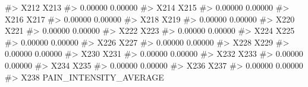 \documentclass[
  letterpaper,
]{latex/krantz}
\makeatletter
\newenvironment{Shaded}{\begin{snugshade}}{\end{snugshade}}
\newcommand{\CommentTok}[1]{\textcolor[rgb]{0.37,0.37,0.37}{#1}}
\newenvironment{kframe}{%
\medskip{}
\setlength{\fboxsep}{.8em}
 \def\at@end@of@kframe{}%
 \ifinner\ifhmode%
  \def\at@end@of@kframe{\end{minipage}}%
  \begin{minipage}{\columnwidth}%
 \fi\fi%
 \def\FrameCommand##1{\hskip\@totalleftmargin \hskip-\fboxsep
 \colorbox{shadecolor}{##1}\hskip-\fboxsep
     \hskip-\linewidth \hskip-\@totalleftmargin \hskip\columnwidth}%
 \MakeFramed {\advance\hsize-\width
   \@totalleftmargin\z@ \linewidth\hsize
   \@setminipage}}%
 {\par\unskip\endMakeFramed%
 \at@end@of@kframe}
\renewenvironment{Shaded}{\begin{kframe}}{\end{kframe}}
\makeatother
\begin{document}
\begin{Shaded}
\begin{Highlighting}[]
\CommentTok{\#\textgreater{}                             X212                             X213 }
\CommentTok{\#\textgreater{}                          0.00000                          0.00000 }
\CommentTok{\#\textgreater{}                             X214                             X215 }
\CommentTok{\#\textgreater{}                          0.00000                          0.00000 }
\CommentTok{\#\textgreater{}                             X216                             X217 }
\CommentTok{\#\textgreater{}                          0.00000                          0.00000 }
\CommentTok{\#\textgreater{}                             X218                             X219 }
\CommentTok{\#\textgreater{}                          0.00000                          0.00000 }
\CommentTok{\#\textgreater{}                             X220                             X221 }
\CommentTok{\#\textgreater{}                          0.00000                          0.00000 }
\CommentTok{\#\textgreater{}                             X222                             X223 }
\CommentTok{\#\textgreater{}                          0.00000                          0.00000 }
\CommentTok{\#\textgreater{}                             X224                             X225 }
\CommentTok{\#\textgreater{}                          0.00000                          0.00000 }
\CommentTok{\#\textgreater{}                             X226                             X227 }
\CommentTok{\#\textgreater{}                          0.00000                          0.00000 }
\CommentTok{\#\textgreater{}                             X228                             X229 }
\CommentTok{\#\textgreater{}                          0.00000                          0.00000 }
\CommentTok{\#\textgreater{}                             X230                             X231 }
\CommentTok{\#\textgreater{}                          0.00000                          0.00000 }
\CommentTok{\#\textgreater{}                             X232                             X233 }
\CommentTok{\#\textgreater{}                          0.00000                          0.00000 }
\CommentTok{\#\textgreater{}                             X234                             X235 }
\CommentTok{\#\textgreater{}                          0.00000                          0.00000 }
\CommentTok{\#\textgreater{}                             X236                             X237 }
\CommentTok{\#\textgreater{}                          0.00000                          0.00000 }
\CommentTok{\#\textgreater{}                             X238           PAIN\_INTENSITY\_AVERAGE }

\end{Highlighting}
\end{Shaded}
\end{document}
